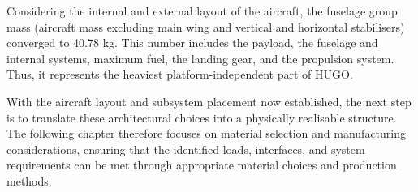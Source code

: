 Considering the internal and external layout of the aircraft, the fuselage group mass (aircraft mass excluding main wing and vertical and horizontal stabilisers) converged to 40.78 kg. This number includes the payload, the fuselage and internal systems, maximum fuel, the landing gear, and the propulsion system. Thus, it represents the heaviest platform-independent part of HUGO.

With the aircraft layout and subsystem placement now established, the next step is to translate these architectural choices into a physically realisable structure. The following chapter therefore focuses on material selection and manufacturing considerations, ensuring that the identified loads, interfaces, and system requirements can be met through appropriate material choices and production methods.

